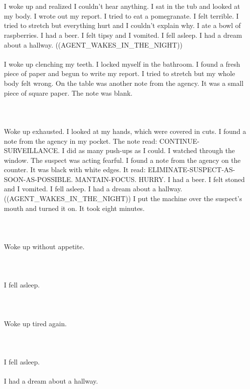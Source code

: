 \documentclass{article}
\begin{document}
    \section{}
    I woke up and realized I couldn't hear anything. I sat in the tub and looked at my body. I wrote out my report. I tried to eat a pomegranate. I felt terrible. I tried to stretch but everything hurt and I couldn't explain why. I ate a bowl of raspberries. I had a beer. I felt tipsy and I vomited. I fell asleep. I had a dream about a hallway. ((AGENT_WAKES_IN_THE_NIGHT)) \\\\I woke up clenching my teeth. I locked myself in the bathroom. I found a fresh piece of paper and begun to write my report. I tried to stretch but my whole body felt wrong. On the table was another note from the agency. It was a small piece of square paper. The note was blank. \\\\
    \newpage
    
    \section{}
    Woke up exhausted. I looked at my hands, which were covered in cuts. I found a note from the agency in my pocket. The note read: CONTINUE-SURVEILLANCE. I did as many push-ups as I could. I watched through the window. The suspect was acting fearful. I found a note from the agency on the counter. It was black with white edges. It read: ELIMINATE-SUSPECT-AS-SOON-AS-POSSIBLE. MANTAIN-FOCUS. HURRY. I had a beer. I felt stoned and I vomited. I fell asleep. I had a dream about a hallway. ((AGENT_WAKES_IN_THE_NIGHT)) I put the machine over the suspect's mouth and turned it on. It took eight minutes. \\\\
    \newpage
    
    \section{}
    Woke up without appetite.\\\\ 
    \newpage
    
    \section{}
    I fell asleep.\\\\ 
    \newpage
    
    \section{}
    Woke up tired again.\\\\ 
    \newpage
    
    \section{}
    I fell asleep.\\\\I had a dream about a hallway.\\\\ 
    \newpage
    
    
\end{document}
